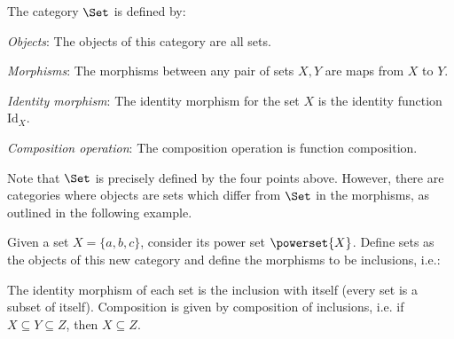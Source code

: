 \begin{shaded}
\begin{definition}
    The category $\Set$ is defined by:
    \begin{compactenum}
    \item \emph{Objects}: The objects of this category are all sets.
    \item \emph{Morphisms}: The morphisms between any pair of sets $X, Y$
    are maps from $X$ to $Y$.
    \item \emph{Identity morphism}: The identity morphism for the set $X$
    is the identity function $\text{Id}_X$.
    \item \emph{Composition operation}: The composition operation is function
    composition.
    \end{compactenum}
\end{definition}
\end{shaded}

Note that $\Set$ is precisely defined by the four points above. However, there are categories where objects are sets which differ from $\Set$ in the morphisms, as outlined in the following example.
\begin{example}
\label{ex:hasseinclusion}
Given a set $X=\{a,b,c\}$, consider its power set $\powerset{X}$. Define sets as the objects of this new category and define the morphisms to be inclusions, i.e.:
\begin{center}
\end{center}
The identity morphism of each set is the inclusion with itself (every set is a subset of itself). Composition is given by composition of inclusions, i.e. if $X\subseteq Y \subseteq Z$, then $X\subseteq Z$.
\end{example}